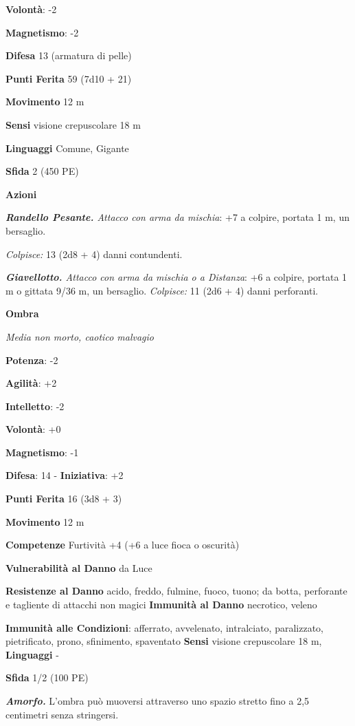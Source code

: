 \begin{multicols}{2}
\textbf{Volontà}: -2

\textbf{Magnetismo}: -2

\textbf{Difesa} 13 (armatura di pelle)

\textbf{Punti Ferita} 59 (7d10 + 21)

\textbf{Movimento} 12 m

\textbf{Sensi} visione crepuscolare 18 m

\textbf{Linguaggi} Comune, Gigante

\textbf{Sfida} 2 (450 PE)\smallskip

\smallskip\textbf{Azioni}

\emph{\textbf{Randello Pesante.} Attacco con arma da mischia}: +7 a
colpire, portata 1 m, un bersaglio.

\emph{Colpisce:} 13 (2d8 + 4) danni contundenti.

\emph{\textbf{Giavellotto.} Attacco con arma da mischia o a Distanza}:
+6 a colpire, portata 1 m o gittata 9/36 m, un bersaglio.
\emph{Colpisce:} 11 (2d6 + 4) danni perforanti.

\textbf{Ombra}

\emph{Media non morto, caotico malvagio}

\textbf{Potenza}: -2

\textbf{Agilità}: +2

\textbf{Intelletto}: -2

\textbf{Volontà}: +0

\textbf{Magnetismo}: -1

\textbf{Difesa}: 14 - \textbf{Iniziativa}: +2

\textbf{Punti Ferita} 16 (3d8 + 3)

\textbf{Movimento} 12 m

\textbf{Competenze} Furtività +4 (+6 a luce fioca o oscurità)

\textbf{Vulnerabilità al Danno} da Luce

\textbf{Resistenze al Danno} acido, freddo, fulmine, fuoco, tuono;
da botta, perforante e tagliente di attacchi non magici
\textbf{Immunità al Danno} necrotico, veleno

\textbf{Immunità alle Condizioni}: afferrato, avvelenato, intralciato,
paralizzato, pietrificato, prono, sfinimento, spaventato \textbf{Sensi}
visione crepuscolare 18 m,  \textbf{Linguaggi} -

\textbf{Sfida} 1/2 (100 PE)\smallskip

\emph{\textbf{Amorfo.}} L'ombra può muoversi attraverso uno spazio
stretto fino a 2,5 centimetri senza stringersi.


\end{multicols}

